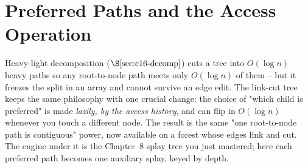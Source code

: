 \section{Preferred Paths and the Access Operation}\label{sec:c23-prefer}

\begin{previouslybox}
Heavy-light decomposition (\(\secref{c16-decomp}\)) cuts a tree into
\(O(\log n)\) heavy paths so any root-to-node path meets only \(O(\log n)\) of
them -- but it freezes the split in an array and cannot survive an edge edit. The
link-cut tree keeps the same philosophy with one crucial change: the choice of
"which child is preferred" is made \emph{lazily, by the access history}, and can
flip in \(O(\log n)\) whenever you touch a different node. The result is the same
"one root-to-node path is contiguous" power, now available on a forest whose edges
link and cut. The engine under it is the Chapter~8 splay tree you just mastered;
here each preferred path becomes one auxiliary splay, keyed by depth.
\end{previouslybox}


